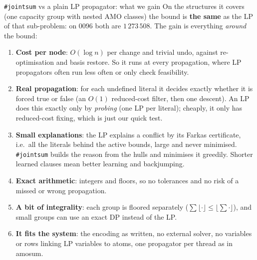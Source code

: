 \documentclass[aspectratio=169,11pt]{beamer}
\begin{document}
\begin{frame}{\texttt{\#jointsum} vs a plain LP propagator: what we gain}
\footnotesize
On the structures it covers (one capacity group with nested AMO classes) the bound is \textbf{the same} as the LP of that
sub-problem: on 0096 both are $1\,273\,508$. The gain is everything \emph{around} the bound:
\begin{enumerate}\setlength\itemsep{2pt}
\item \textbf{Cost per node}: $O(\log n)$ per change and trivial undo, against re-optimisation and basis restore. So it runs
  at every propagation, where LP propagators often run less often or only check feasibility.
\item \textbf{Real propagation}: for each undefined literal it decides exactly whether it is forced true or false (an $O(1)$
  reduced-cost filter, then one descent). An LP does this exactly only by \emph{probing} (one LP per literal); cheaply, it only
  has reduced-cost fixing, which is just our quick test.
\item \textbf{Small explanations}: the LP explains a conflict by its Farkas certificate, i.e.\ all the literals behind the
  active bounds, large and never minimised. \texttt{\#jointsum} builds the reason from the hulls and minimises it greedily.
  Shorter learned clauses mean better learning and backjumping.
\item \textbf{Exact arithmetic}: integers and floors, so no tolerances and no risk of a missed or wrong propagation.
\item \textbf{A bit of integrality}: each group is floored separately ($\sum\lfloor\cdot\rfloor \le \lfloor\sum\cdot\rfloor$),
  and small groups can use an exact DP instead of the LP.
\item \textbf{It fits the system}: the encoding as written, no external solver, no variables or rows linking LP variables to
  atoms, one propagator per thread as in amosum.
\end{enumerate}
\end{frame}
\end{document}
